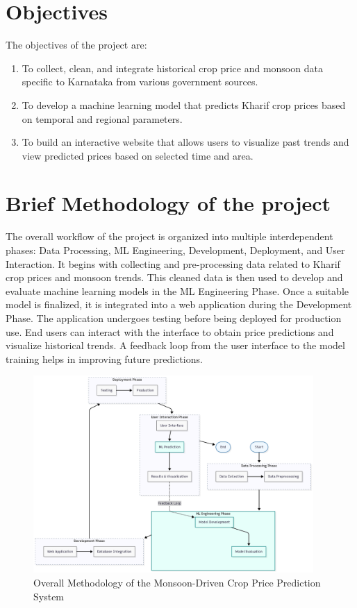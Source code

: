 \section[Objectives]{\textbf{Objectives}}
The objectives of the project are:
\begin{enumerate}
	\item To collect, clean, and integrate historical crop price and monsoon data specific to Karnataka from various government sources.
	\item To develop a machine learning model that predicts Kharif crop prices based on temporal and regional parameters.
	\item To build an interactive website that allows users to visualize past trends and view predicted prices based on selected time and area.
\end{enumerate}

\section[Brief Methodology of the project]{\textbf{Brief Methodology of the project}}

The overall workflow of the project is organized into multiple interdependent phases: Data Processing, ML Engineering, Development, Deployment, and User Interaction. It begins with collecting and pre-processing data related to Kharif crop prices and monsoon trends. This cleaned data is then used to develop and evaluate machine learning models in the ML Engineering Phase. Once a suitable model is finalized, it is integrated into a web application during the Development Phase. The application undergoes testing before being deployed for production use. End users can interact with the interface to obtain price predictions and visualize historical trends. A feedback loop from the user interface to the model training helps in improving future predictions.

\begin{figure}[H]
	\centering
	\includegraphics[width=0.95\textwidth]{Figures/Methodology_IDP.png}
	\caption{Overall Methodology of the Monsoon-Driven Crop Price Prediction System}
	\label{fig:methodology}
\end{figure}

